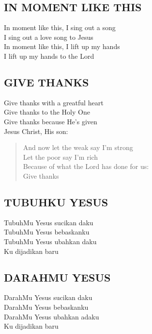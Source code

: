 \subsection{ IN MOMENT LIKE THIS}
\begin{altverse}
In moment like this, I sing out a song\\
I sing out a love song to Jesus\\
In moment like this, I lift up my hands\\
I lift up my hands to the Lord
\end{altverse}

\subsection{ GIVE THANKS}
\begin{altverse}
Give thanks with a greatful heart\\
Give thanks to the Holy One\\
Give thanks because He’s given\\
Jesus Christ, His son:
\end{altverse}

\begin{verse}
And now let the weak say I’m strong\\
Let the poor say I’m rich\\
Because of what the Lord has done for us:\\
Give thanks

\end{verse}

\subsection{ TUBUHKU YESUS}
\begin{altverse}
TubuhMu Yesus sucikan daku\\
TubuhMu Yesus bebaskanku\\
TubuhMu Yesus ubahkan daku\\
Ku dijadikan baru
\end{altverse}

\subsection{ DARAHMU YESUS}
\begin{altverse}
DarahMu Yesus sucikan daku\\
DarahMu Yesus bebaskanku\\
DarahMu Yesus ubahkan adaku\\
Ku dijadikan baru
\end{altverse}


